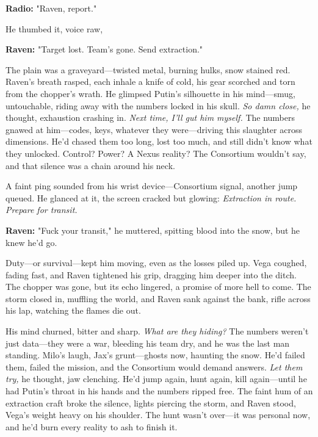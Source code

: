 \documentclass[12pt]{book}
\begin{document}
\vspace{0.5em}
\textbf{Radio:} "Raven, report."

He thumbed it, voice raw,

\vspace{0.5em}
\textbf{Raven:} "Target lost. Team’s gone. Send extraction."

The plain was a graveyard—twisted metal, burning hulks, snow stained red. Raven’s breath rasped, each inhale a knife of cold, his gear scorched and torn from the chopper’s wrath. He glimpsed Putin’s silhouette in his mind—smug, untouchable, riding away with the numbers locked in his skull. \textit{So damn close,} he thought, exhaustion crashing in. \textit{Next time, I’ll gut him myself.} The numbers gnawed at him—codes, keys, whatever they were—driving this slaughter across dimensions. He’d chased them too long, lost too much, and still didn’t know what they unlocked. Control? Power? A Nexus reality? The Consortium wouldn’t say, and that silence was a chain around his neck.

A faint ping sounded from his wrist device—Consortium signal, another jump queued. He glanced at it, the screen cracked but glowing: \textit{Extraction in route. Prepare for transit.}

\vspace{0.5em}
\textbf{Raven:} "Fuck your transit," he muttered, spitting blood into the snow, but he knew he’d go.

Duty—or survival—kept him moving, even as the losses piled up. Vega coughed, fading fast, and Raven tightened his grip, dragging him deeper into the ditch. The chopper was gone, but its echo lingered, a promise of more hell to come. The storm closed in, muffling the world, and Raven sank against the bank, rifle across his lap, watching the flames die out.

His mind churned, bitter and sharp. \textit{What are they hiding?} The numbers weren’t just data—they were a war, bleeding his team dry, and he was the last man standing. Milo’s laugh, Jax’s grunt—ghosts now, haunting the snow. He’d failed them, failed the mission, and the Consortium would demand answers. \textit{Let them try,} he thought, jaw clenching. He’d jump again, hunt again, kill again—until he had Putin’s throat in his hands and the numbers ripped free. The faint hum of an extraction craft broke the silence, lights piercing the storm, and Raven stood, Vega’s weight heavy on his shoulder. The hunt wasn’t over—it was personal now, and he’d burn every reality to ash to finish it.
\end{document}
